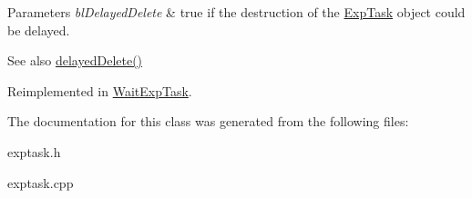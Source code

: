 \begin{DoxyParams}{Parameters}
{\em bl\+Delayed\+Delete} & true if the destruction of the \hyperlink{class_exp_task}{Exp\+Task} object could be delayed.\\
\hline
\end{DoxyParams}
\begin{DoxySeeAlso}{See also}
\hyperlink{class_exp_task_a440f37ee2170c077082f3d29f229be1b}{delayed\+Delete()} 
\end{DoxySeeAlso}


Reimplemented in \hyperlink{class_wait_exp_task_a34d831c5c3497c9e315a5323e9e45b02}{Wait\+Exp\+Task}.



The documentation for this class was generated from the following files\+:\begin{DoxyCompactItemize}
\item 
exptask.\+h\item 
exptask.\+cpp\end{DoxyCompactItemize}
